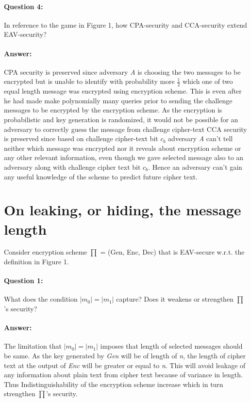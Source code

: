 \documentclass{article}
\begin{document}
    \paragraph{Question 4:} In reference to the game in Figure 1, how CPA-security and CCA-security extend EAV-security?
    \paragraph{Answer: \newline}
        CPA security is preserved since adversary \emph{A} is choosing the two messages to be encrypted but is unable to identify with probability more $\frac{1}{2}$ which one of two equal length message was encrypted using encryption scheme. This is even after he had made make polynomially many queries prior to sending the challenge messages to be encrypted by the encryption scheme. As the encryption is probabilistic and key generation is randomized, it would not be possible for an adversary to correctly guess the message from challenge cipher-text \newline \newline
        CCA security is preserved since based on challenge cipher-text bit $c_b$ adversary \emph{A} can't tell neither which message was encrypted nor it reveals about encryption scheme or any other relevant information, even though we gave selected message also to an adversary along with challenge cipher text bit $c_b$. Hence an adversary can't gain any useful knowledge of the scheme to predict future cipher text.

\section{On leaking, or hiding, the message length}
    Consider encryption scheme $\prod$ = (Gen, Enc, Dec) that is EAV-secure w.r.t. the definition in Figure 1.
    
    \paragraph{Question 1:} What does the condition $|m_0| = |m_1|$ capture? Does it weakens or strengthen $\prod$'s security?
    \paragraph{Answer: \newline}
        The limitation that $|m_0| = |m_1|$ imposes that length of selected messages should be same. As the key generated by \emph{Gen} will be of length of \emph{n}, the length of cipher text at the output of \emph{Enc} will be greater or equal to \emph{n}. \newline
        This will avoid leakage of any information about plain text from cipher text because of variance in length. Thus Indistinguishability of the encryption scheme increase which in turn strengthen $\prod$'s security.
        
\end{document}
